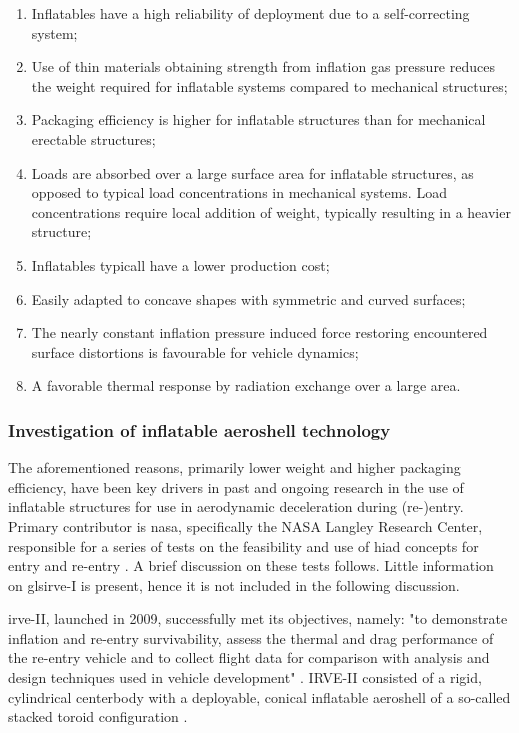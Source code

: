 \begin{enumerate}
\item Inflatables have a high reliability of deployment due to a self-correcting system;
\item Use of thin materials obtaining strength from inflation gas pressure reduces the weight required for inflatable systems compared to mechanical structures;
\item Packaging efficiency is higher for inflatable structures than for mechanical erectable structures;
\item Loads are absorbed over a large surface area for inflatable structures, as opposed to typical load concentrations in mechanical systems. Load concentrations require local addition of weight, typically resulting in a heavier structure;
\item Inflatables typicall have a lower production cost;
\item Easily adapted to concave shapes with symmetric and curved surfaces;
\item The nearly constant inflation pressure induced force restoring encountered surface distortions is favourable for vehicle dynamics;
\item A favorable thermal response by radiation exchange over a large area.
\end{enumerate}

\subsubsection{Investigation of inflatable aeroshell technology}
The aforementioned reasons, primarily lower weight and higher packaging efficiency, have been key drivers in past and ongoing research in the use of inflatable structures for use in aerodynamic deceleration during (re-)entry. Primary contributor is \gls{nasa}, specifically the NASA Langley Research Center, responsible for a series of tests on the feasibility and use of \gls{hiad} concepts for entry and re-entry \cite{Hughes2005, Dillman2010, Dillman2012, Dillman2014}. A brief discussion on these tests follows. Little information on gls{irve}-I \cite{Hughes2005} is present, hence it is not included in the following discussion.  

\gls{irve}-II, launched in 2009, successfully met its objectives, namely: "to demonstrate inflation and re-entry survivability, assess the thermal and drag performance of the re-entry vehicle and to collect flight data for comparison with analysis and design techniques used in vehicle development" \cite[p.1]{Dillman2010}. IRVE-II consisted of a rigid, cylindrical centerbody with a deployable, conical inflatable aeroshell of a so-called stacked toroid configuration \cite{Smith2010,Bose2009}.


